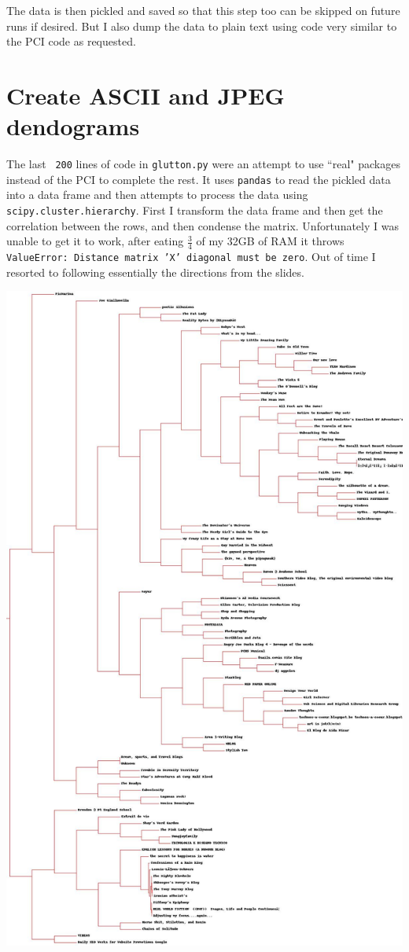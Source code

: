 \documentclass[12pt, a4paper]{article}
\newcommand{\code}[1]{\texttt{#1}}
\begin{document}
The data is then pickled and saved so that this step too can be skipped on future runs if desired. But I also dump the data to plain text using code very similar to the PCI code as requested.

\section{Create ASCII and JPEG dendograms}

The last \code{~200} lines of code in \code{glutton.py} were an attempt to use ``real" packages instead of the PCI to complete the rest. It uses \code{pandas} to read the pickled data into a data frame and then attempts to process the data using \code{scipy.cluster.hierarchy}. First I transform the data frame and then get the correlation between the rows, and then condense the matrix. Unfortunately I was unable to get it to work, after eating $\tfrac{3}{4}$ of my 32GB of RAM it throws \code{ValueError: Distance matrix 'X' diagonal must be zero}. Out of time I resorted to following essentially the directions from the slides.

\includegraphics[width=\textwidth, height=\textheight]{../art/blogclust.jpg}
\end{document}
